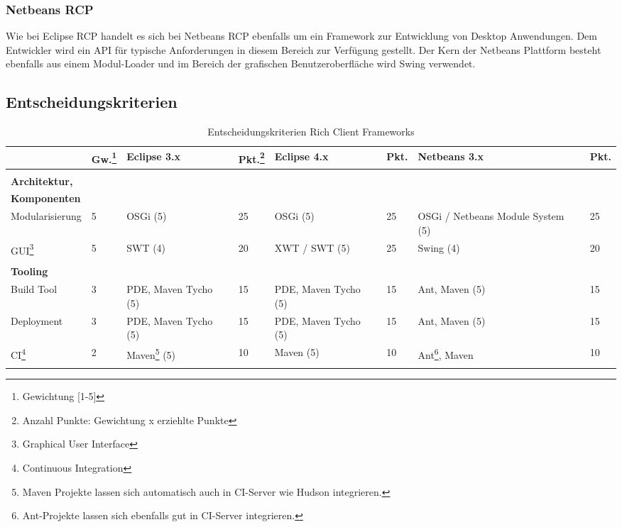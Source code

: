 \subsubsection{Netbeans RCP}
Wie bei Eclipse RCP handelt es sich bei Netbeans RCP ebenfalls um ein Framework zur Entwicklung von Desktop Anwendungen. Dem Entwickler wird ein API für typische Anforderungen in diesem Bereich zur Verfügung gestellt. Der Kern der Netbeans Plattform besteht ebenfalls aus einem Modul-Loader und im Bereich der grafischen Benutzeroberfläche wird Swing verwendet.

\subsection{Entscheidungskriterien}
\begin{longtable}{|p{2.8cm}|p{0.7cm}|p{2.1cm}|p{0.7cm}|p{2.1cm}|p{0.7cm}|p{2.2cm}|p{0.7cm}|}
    \caption{Entscheidungskriterien Rich Client Frameworks}\\\hline
  & \textbf{Gw.\footnote{Gewichtung [1-5]}} & \textbf{Eclipse 3.x}& \textbf{Pkt.\footnote{Anzahl Punkte: Gewichtung x erziehlte Punkte}} & \textbf{Eclipse 4.x} &\textbf{Pkt.} & \textbf{Netbeans 3.x}& \textbf{Pkt.}\\\hline
 \multicolumn{8}{|l|}{}\\  
\multicolumn{8}{|l|}{\textbf{Architektur,}}\\
  \multicolumn{8}{|l|}{\textbf{Komponenten}}\\\hline
  Modularisierung &5 & OSGi (5) & 25 & OSGi (5) & 25 & OSGi / Netbeans Module System (5) & 25\\\hline
  GUI\footnote{Graphical User Interface} &5 & SWT (4) & 20 & XWT / SWT (5) & 25 & Swing (4) & 20\\\hline
  \multicolumn{8}{|l|}{}\\
  \multicolumn{8}{|l|}{\textbf{Tooling}}\\\hline
  Build Tool &3 & PDE, Maven Tycho (5) & 15 & PDE, Maven Tycho (5) & 15 & Ant, Maven (5) & 15\\\hline
  Deployment & 3 & PDE, Maven Tycho (5) & 15 & PDE, Maven Tycho (5) & 15 & Ant, Maven (5)& 15\\\hline
 CI\footnote{Continuous Integration} &2 & Maven\footnote{Maven Projekte lassen sich automatisch auch in CI-Server wie Hudson integrieren.} (5) & 10 &Maven (5) & 10& Ant\footnote{Ant-Projekte lassen sich ebenfalls gut in CI-Server integrieren.}, Maven & 10\\\hline 
 \multicolumn{8}{|l|}{}\\

\end{longtable}

